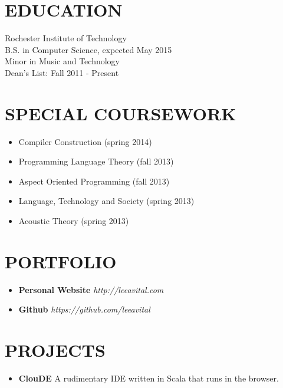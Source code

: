 \documentclass[line,margin]{res}
\begin{document}
\address{(646) 320-9143\\leeavital@gmail.com}


\begin{resume}

\section{EDUCATION}   Rochester Institute of Technology \\
                      B.S. in  Computer Science,  expected May 2015 \\
	                    Minor in Music and Technology\\
	                    Dean's List: Fall 2011 - Present


\section{SPECIAL COURSEWORK}
\begin{itemize}
   \item Compiler Construction (spring 2014)
   \item Programming Language Theory (fall 2013)
   \item Aspect Oriented Programming (fall 2013)
   \item Language, Technology and Society (spring 2013)
   \item Acoustic Theory (spring 2013)
\end{itemize}


\section{PORTFOLIO}

\begin{itemize}
   \item {\bf Personal Website}  {\sl http://leeavital.com}
   \item {\bf Github}	{\sl  https://github.com/leeavital }
\end{itemize}



\section{PROJECTS}

\begin{itemize}


\item {\bf ClouDE} A rudimentary IDE written in Scala that runs in the browser.


\end{itemize}
\end{resume}
\end{document}
